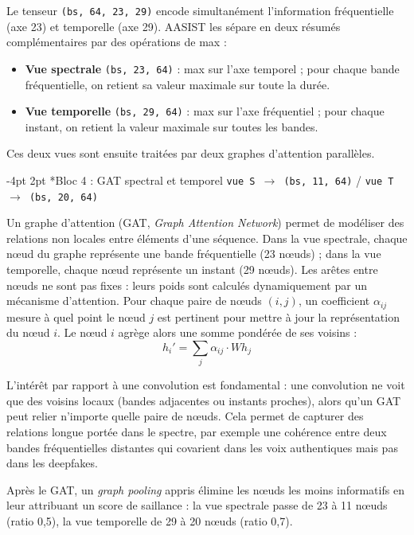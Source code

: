 \documentclass[10pt, a4paper]{article}
\makeatletter
\renewcommand{\subsubsection}{\@startsection{subsubsection}{3}{\z@}%
  {-4pt \@plus -1pt \@minus -1pt}{2pt \@plus 1pt}%
  {\normalfont\normalsize\bfseries\itshape}}
\makeatother
\begin{document}
Le tenseur \texttt{(bs, 64, 23, 29)} encode simultanément l'information fréquentielle (axe 23) et temporelle (axe 29). AASIST les sépare en deux résumés complémentaires par des opérations de max :

\begin{itemize}
  \item \textbf{Vue spectrale} \texttt{(bs, 23, 64)} : max sur l'axe temporel ; pour chaque bande fréquentielle, on retient sa valeur maximale sur toute la durée.
  \item \textbf{Vue temporelle} \texttt{(bs, 29, 64)} : max sur l'axe fréquentiel ; pour chaque instant, on retient la valeur maximale sur toutes les bandes.
\end{itemize}

Ces deux vues sont ensuite traitées par deux graphes d'attention parallèles.

\subsubsection*{Bloc 4 : GAT spectral et temporel \texttt{vue S $\rightarrow$ (bs, 11, 64)} / \texttt{vue T $\rightarrow$ (bs, 20, 64)}}

Un graphe d'attention (GAT, \textit{Graph Attention Network}) permet de modéliser des relations non locales entre éléments d'une séquence. Dans la vue spectrale, chaque nœud du graphe représente une bande fréquentielle (23 nœuds) ; dans la vue temporelle, chaque nœud représente un instant (29 nœuds). Les arêtes entre nœuds ne sont pas fixes : leurs poids sont calculés dynamiquement par un mécanisme d'attention. Pour chaque paire de nœuds $(i, j)$, un coefficient $\alpha_{ij}$ mesure à quel point le nœud $j$ est pertinent pour mettre à jour la représentation du nœud $i$. Le nœud $i$ agrège alors une somme pondérée de ses voisins :
\[
  h_i' = \sum_j \alpha_{ij} \cdot W h_j
\]

L'intérêt par rapport à une convolution est fondamental : une convolution ne voit que des voisins locaux (bandes adjacentes ou instants proches), alors qu'un GAT peut relier n'importe quelle paire de nœuds. Cela permet de capturer des relations longue portée dans le spectre, par exemple une cohérence entre deux bandes fréquentielles distantes qui covarient dans les voix authentiques mais pas dans les deepfakes.

Après le GAT, un \textit{graph pooling} appris élimine les nœuds les moins informatifs en leur attribuant un score de saillance : la vue spectrale passe de 23 à 11 nœuds (ratio 0,5), la vue temporelle de 29 à 20 nœuds (ratio 0,7).
\end{document}
